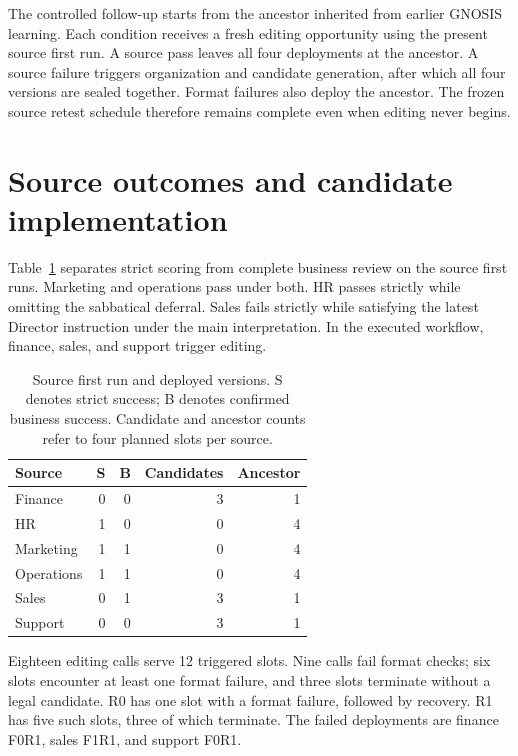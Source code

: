 The controlled follow-up starts from the ancestor inherited from earlier GNOSIS learning. Each condition receives a fresh editing opportunity using the present source first run. A source pass leaves all four deployments at the ancestor. A source failure triggers organization and candidate generation, after which all four versions are sealed together. Format failures also deploy the ancestor. The frozen source retest schedule therefore remains complete even when editing never begins.

\section{Source outcomes and candidate implementation}

Table~\ref{tab:sources} separates strict scoring from complete business review on the source first runs. Marketing and operations pass under both. HR passes strictly while omitting the sabbatical deferral. Sales fails strictly while satisfying the latest Director instruction under the main interpretation. In the executed workflow, finance, sales, and support trigger editing.

\begin{table}[t]
\centering
\caption{Source first run and deployed versions. S denotes strict success; B denotes confirmed business success. Candidate and ancestor counts refer to four planned slots per source.}
\label{tab:sources}
\small
\renewcommand{\arraystretch}{1.13}
\begin{tabular*}{\columnwidth}{@{\extracolsep{\fill}}lrrrr@{}}
\toprule
Source & S & B & Candidates & Ancestor\\
\midrule
Finance & 0 & 0 & 3 & 1\\
HR & 1 & 0 & 0 & 4\\
Marketing & 1 & 1 & 0 & 4\\
Operations & 1 & 1 & 0 & 4\\
Sales & 0 & 1 & 3 & 1\\
Support & 0 & 0 & 3 & 1\\
\bottomrule
\end{tabular*}
\end{table}

Eighteen editing calls serve 12 triggered slots. Nine calls fail format checks; six slots encounter at least one format failure, and three slots terminate without a legal candidate. R0 has one slot with a format failure, followed by recovery. R1 has five such slots, three of which terminate. The failed deployments are finance F0R1, sales F1R1, and support F0R1.

